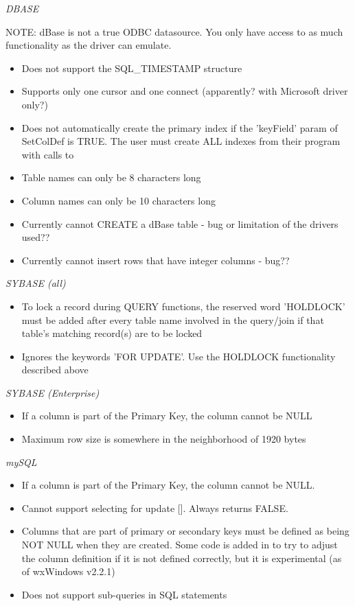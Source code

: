 {\it DBASE}

NOTE: dBase is not a true ODBC datasource. You only have access to as much 
functionality as the driver can emulate.

\begin{itemize}\itemsep=0pt
\item Does not support the SQL\_TIMESTAMP structure
\item Supports only one cursor and one connect (apparently? with Microsoft driver only?)
\item Does not automatically create the primary index if the 'keyField' param of SetColDef is TRUE. The user must create ALL indexes from their program with calls to 
\item Table names can only be 8 characters long
\item Column names can only be 10 characters long
\item Currently cannot CREATE a dBase table - bug or limitation of the drivers used??
\item Currently cannot insert rows that have integer columns - bug??
\end{itemize}

{\it SYBASE (all)}
\begin{itemize}\itemsep=0pt
\item To lock a record during QUERY functions, the reserved word 'HOLDLOCK' must be added after every table name involved in the query/join if that table's matching record(s) are to be locked
\item Ignores the keywords 'FOR UPDATE'. Use the HOLDLOCK functionality described above
\end{itemize}

{\it SYBASE (Enterprise)}
\begin{itemize}\itemsep=0pt
\item If a column is part of the Primary Key, the column cannot be NULL
\item Maximum row size is somewhere in the neighborhood of 1920 bytes
\end{itemize}

{\it mySQL}
\begin{itemize}\itemsep=0pt
\item If a column is part of the Primary Key, the column cannot be NULL.
\item Cannot support selecting for update []. Always returns FALSE.
\item Columns that are part of primary or secondary keys must be defined as being NOT NULL when they are created. Some code is added in  to try to adjust the column definition if it is not defined correctly, but it is experimental (as of wxWindows v2.2.1)
\item Does not support sub-queries in SQL statements
\end{itemize}

